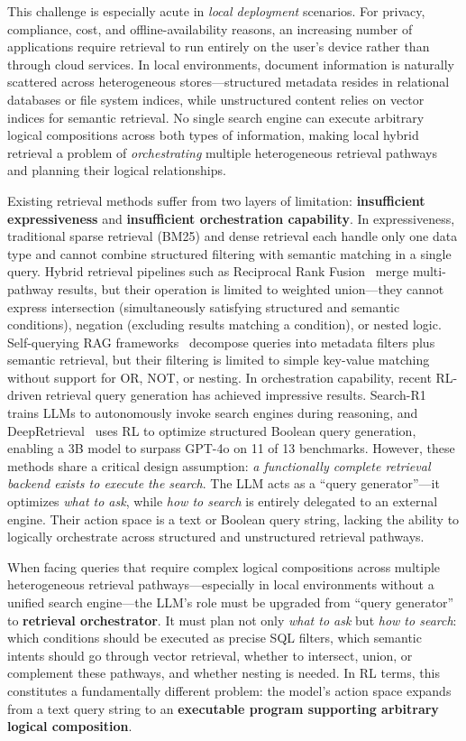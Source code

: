 \documentclass[11pt]{article}
\begin{document}
This challenge is especially acute in \emph{local deployment} scenarios.
For privacy, compliance, cost, and offline-availability reasons, an increasing number of applications require retrieval to run entirely on the user's device rather than through cloud services.
In local environments, document information is naturally scattered across heterogeneous stores---structured metadata resides in relational databases or file system indices, while unstructured content relies on vector indices for semantic retrieval.
No single search engine can execute arbitrary logical compositions across both types of information, making local hybrid retrieval a problem of \emph{orchestrating} multiple heterogeneous retrieval pathways and planning their logical relationships.

Existing retrieval methods suffer from two layers of limitation: \textbf{insufficient expressiveness} and \textbf{insufficient orchestration capability}.
In expressiveness, traditional sparse retrieval (BM25) and dense retrieval each handle only one data type and cannot combine structured filtering with semantic matching in a single query.
Hybrid retrieval pipelines such as Reciprocal Rank Fusion~\cite{cormack2009reciprocal} merge multi-pathway results, but their operation is limited to weighted union---they cannot express intersection (simultaneously satisfying structured and semantic conditions), negation (excluding results matching a condition), or nested logic.
Self-querying RAG frameworks~\cite{langchain2023selfquery} decompose queries into metadata filters plus semantic retrieval, but their filtering is limited to simple key-value matching without support for OR, NOT, or nesting.
In orchestration capability, recent RL-driven retrieval query generation has achieved impressive results.
Search-R1~\cite{jin2025search} trains LLMs to autonomously invoke search engines during reasoning, and DeepRetrieval~\cite{jiang2025deepretrieval} uses RL to optimize structured Boolean query generation, enabling a 3B model to surpass GPT-4o on 11 of 13 benchmarks.
However, these methods share a critical design assumption: \emph{a functionally complete retrieval backend exists to execute the search}.
The LLM acts as a ``query generator''---it optimizes \emph{what to ask}, while \emph{how to search} is entirely delegated to an external engine.
Their action space is a text or Boolean query string, lacking the ability to logically orchestrate across structured and unstructured retrieval pathways.

When facing queries that require complex logical compositions across multiple heterogeneous retrieval pathways---especially in local environments without a unified search engine---the LLM's role must be upgraded from ``query generator'' to \textbf{retrieval orchestrator}.
It must plan not only \emph{what to ask} but \emph{how to search}: which conditions should be executed as precise SQL filters, which semantic intents should go through vector retrieval, whether to intersect, union, or complement these pathways, and whether nesting is needed.
In RL terms, this constitutes a fundamentally different problem: the model's action space expands from a text query string to an \textbf{executable program supporting arbitrary logical composition}.
\end{document}
